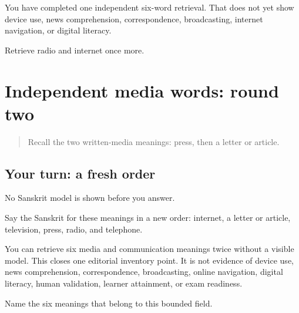 \begin{grammarlens}[title={What you've built: boundary}]
You have completed one independent six-word retrieval. That does not yet show device use, news comprehension, correspondence, broadcasting, internet navigation, or digital literacy.
\end{grammarlens}

\begin{tcolorbox}[breakable,colback=teal!4,colframe=teal!35!black,title={Before you move on}]
Retrieve radio and internet once more.
\end{tcolorbox}
\section[(independent media retrieval, second …]{Independent media words: round two}

\label{lesson:SA-C269-media-final-retrieval}



\begin{quote}
Recall the two written-media meanings: press, then a letter or article.
\end{quote}

\subsection*{Your turn: a fresh order}
No Sanskrit model is shown before you answer.

Say the Sanskrit for these meanings in a new order: internet, a letter or article, television, press, radio, and telephone.

\begin{grammarlens}[title={What you've built: boundary}]
You can retrieve six media and communication meanings twice without a visible model. This closes one editorial inventory point. It is not evidence of device use, news comprehension, correspondence, broadcasting, online navigation, digital literacy, human validation, learner attainment, or exam readiness.
\end{grammarlens}

\begin{tcolorbox}[breakable,colback=teal!4,colframe=teal!35!black,title={Before you move on}]
Name the six meanings that belong to this bounded field.
\end{tcolorbox}
